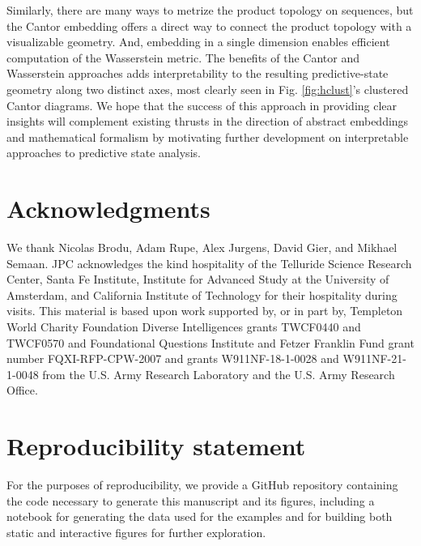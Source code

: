 \documentclass[draft,aps,pre,twocolumn,groupaddress,showkeys,nofootinbib,preprintnumbers,floatfix]{revtex4-2}
\begin{document}
Similarly, there are many ways to metrize the product topology on sequences, but
the Cantor embedding offers a direct way to connect the product topology with a
visualizable geometry. And, embedding in a single dimension enables efficient
computation of the Wasserstein metric. The benefits of the Cantor and
Wasserstein approaches adds interpretability to the resulting predictive-state
geometry along two distinct axes, most clearly seen in Fig. \ref{fig:hclust}'s
clustered Cantor diagrams. We hope that the success of this approach in
providing clear insights will complement existing thrusts in the direction of
abstract embeddings and mathematical formalism by motivating further development
on interpretable approaches to predictive state analysis.

\vspace{-0.2in}
\section*{Acknowledgments}
\vspace{-0.2in}
We thank Nicolas Brodu, Adam Rupe, Alex Jurgens, David Gier, and Mikhael
Semaan. JPC acknowledges the kind hospitality of the Telluride Science
Research Center, Santa Fe Institute, Institute for Advanced Study at the
University of Amsterdam, and California Institute of Technology for their
hospitality during visits. This material is based upon work supported by, or
in part by, Templeton World Charity Foundation Diverse Intelligences grants TWCF0440 and TWCF0570 and Foundational Questions Institute and Fetzer Franklin Fund grant number FQXI-RFP-CPW-2007 and grants W911NF-18-1-0028 and
W911NF-21-1-0048 from the U.S. Army Research Laboratory and the U.S. Army
Research Office.  

\vspace{-0.2in}
\section*{Reproducibility statement}
\vspace{-0.2in}
For the purposes of reproducibility, we provide a 
GitHub repository \cite{repo} containing
the code necessary to generate this manuscript and its figures, including a
notebook for generating the data used for the examples and for building both
static and interactive figures for further exploration.



\end{document}

